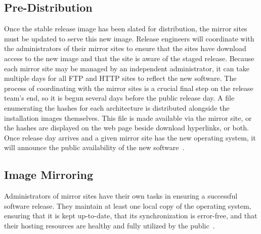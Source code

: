 \documentclass[conference]{IEEEtran}
\begin{document}
\subsection{Pre-Distribution}
Once the stable release image has been slated for distribution,
the mirror sites must be updated to serve this new image.
Release engineers will coordinate with the administrators of their mirror
sites to ensure that the sites have download access to the new image and
that the site is aware of the staged release.
Because each mirror site may be managed by an independent administrator,
it can take multiple days for all FTP and HTTP sites
to reflect the new software.
The process of coordinating with the mirror sites is a crucial final step
on the release team's end, so it is begun several days before
the public release day.
A file enumerating the hashes for each architecture is distributed 
alongside the installation images themselves.
This file is made available via the mirror site, or the hashes are displayed
on the web page beside download hyperlinks, or both.
Once release day arrives and a given mirror site has
the new operating system, it will announce the public availability
of the new software~\cite{freebsdftp}.

\subsection{Image Mirroring}
Administrators of mirror sites have their own tasks
in ensuring a successful software release.
They maintain at least one local copy of the operating system,
ensuring that it is kept up-to-date, that its synchronization
is error-free, and that their hosting resources are healthy
and fully utilized by the public~\cite{freebsdmirror}.
\end{document}
